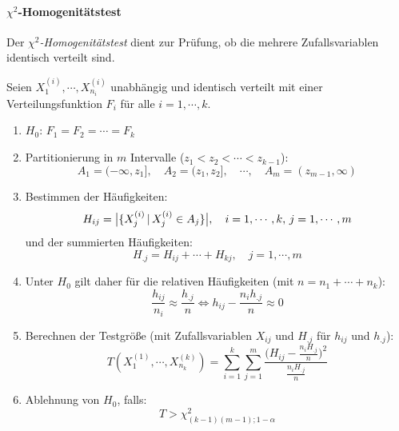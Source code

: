 		\paragraph{\(\chi^2\)-Homogenitätstest}
			Der \textit{\(\chi^2\)-Homogenitätstest} dient zur Prüfung, ob die mehrere Zufallsvariablen identisch verteilt sind.

			Seien \( X_1^{(i)}, \cdots, X_{n_i}^{(i)} \) unabhängig und identisch verteilt mit einer Verteilungsfunktion \(F_i\) für alle \( i = 1, \cdots, k \).
			\begin{enumerate}
				\item \(H_0\): \quad \( F_1 = F_2 = \cdots = F_k \)
				\item Partitionierung in \(m\) Intervalle (\( z_1 < z_2 < \cdots < z_{k-1} \)):
					\begin{equation*}
						A_1 = (-\infty, z_1], \quad A_2 = (z_1, z_2], \quad \cdots, \quad A_m = (z_{m-1}, \infty)
					\end{equation*}
				\item Bestimmen der Häufigkeiten:
					\begin{equation*}
						H_{ij} = \big| \{ X_j^{(i)} \,\vert\, X_j^{(i)} \in A_j \} \big|, \quad i = 1, \cdots, k,\, j = 1, \cdots, m
					\end{equation*}
					und der summierten Häufigkeiten:
					\begin{equation*}
						H_{.j} = H_{ij} + \cdots + H_{kj}, \quad j = 1, \cdots, m
					\end{equation*}
				\item Unter \(H_0\) gilt daher für die relativen Häufigkeiten (mit \( n = n_1 + \cdots + n_k \)):
					\begin{equation*}
						\frac{h_{ij}}{n_i} \approx \frac{h_{.j}}{n} \iff h_{ij} - \frac{n_i h_{.j}}{n} \approx 0
					\end{equation*}
				\item Berechnen der Testgröße (mit Zufallsvariablen \(X_{ij}\) und \(H_{.j}\) für \(h_{ij}\) und \(h_{.j}\)):
					\begin{equation*}
						T(X_1^{(1)}, \cdots, X_{n_k}^{(k)}) = \sum_{i=1}^{k} \sum_{j=1}^m \frac{\Big(H_{ij} - \frac{n_i H_{.j}}{n}\Big)^2}{\frac{n_i H_{.j}}{n}}
					\end{equation*}
				\item Ablehnung von \(H_0\), falls:
					\begin{equation*}
						T > \chi_{(k-1)(m-1); 1-\alpha}^2
					\end{equation*}
			\end{enumerate}


